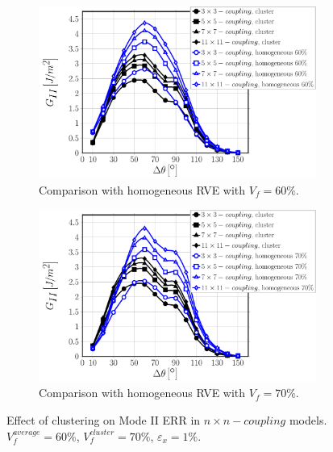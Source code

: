 \documentclass[review]{elsarticle}
\begin{document}
\begin{figure}[!h]
\centering
    \begin{subfigure}[b]{0.475\textwidth}
        \includegraphics[width=\textwidth]{nxn-coupling-vf60-GII.pdf}
        \caption{Comparison with homogeneous RVE with $V_{f}=60\%$.}\label{subfig:clusterCouplingnxnModeII60}
    \end{subfigure}\quad
    \begin{subfigure}[b]{0.475\textwidth}
        \includegraphics[width=\textwidth]{nxn-coupling-vf70-GII.pdf}
        \caption{Comparison with homogeneous RVE with $V_{f}=70\%$.}\label{subfig:clusterCouplingnxnModeII70}
    \end{subfigure}

\caption{Effect of clustering on Mode II ERR in $n\times n-coupling$ models. $V^{average}_{f}=60\%$, $V^{cluster}_{f}=70\%$, $\varepsilon_{x}=1\%$.}\label{fig:clusterCouplingnxnModeII}
\end{figure}
\end{document}
